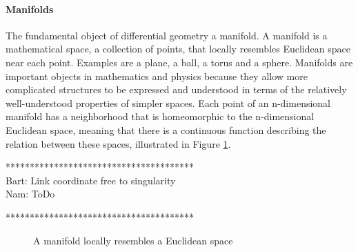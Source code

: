 
\paragraph{Manifolds}
The fundamental object of differential geometry a manifold. A manifold is a mathematical space, a collection of points, that locally resembles Euclidean space near each point. Examples are a plane, a ball, a torus and a sphere. Manifolds are important objects in mathematics and physics because they allow more complicated structures to be expressed and understood in terms of the relatively well-understood properties of simpler spaces. Each point of an n-dimensional manifold has a neighborhood that is homeomorphic to the n-dimensional Euclidean space, meaning that there is a continuous function describing the relation between these spaces, illustrated in Figure \ref{fig:mod.manifold}.

***************************************\\
Bart: Link coordinate free to singularity\\
Nam: ToDo

***************************************\\
\begin{figure}[h!]
	\centering
	\caption{A manifold locally resembles a Euclidean space\label{fig:mod.manifold}}
\end{figure}	

